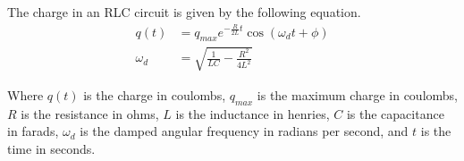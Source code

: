 The charge in an RLC circuit is given by the following equation.
\begin{align*}
    q(t) &= q_{max}e^{-\frac{R}{2L}t}\cos(\omega_d t + \phi)\\
    \omega_d &= \sqrt{\frac{1}{LC} - \frac{R^2}{4L^2}}
\end{align*}

Where $q(t)$ is the charge in coulombs, $q_{max}$ is the maximum charge in coulombs, $R$ is the resistance in ohms, $L$ is the inductance in henries, $C$ is 
the capacitance in farads, $\omega_d$ is the damped angular frequency in radians per second, and $t$ is the time in seconds.\\
